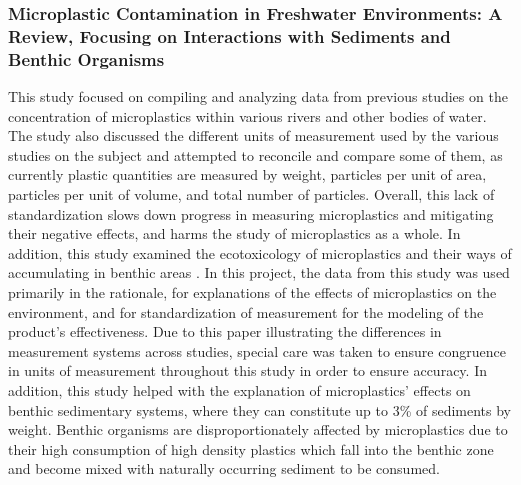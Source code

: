 \documentclass[fleqn,10pt]{SelfArx} %
\begin{document}
	\subsubsection*{Microplastic Contamination in Freshwater Environments: A Review, Focusing on Interactions with Sediments and Benthic Organisms
	}
	This study focused on compiling and analyzing data from previous studies on the concentration of microplastics within various rivers and other bodies of water. The study also discussed the different units of measurement used by the various studies on the subject and attempted to reconcile and compare some of them, as currently plastic quantities are measured by weight, particles per unit of area, particles per unit of volume, and total number of particles. Overall, this lack of standardization slows down progress in measuring microplastics and mitigating their negative effects, and harms the study of microplastics as a whole. In addition, this study examined the ecotoxicology of microplastics and their ways of accumulating in \gls{benthic} areas \cite{BellasiBenthic}.
	In this project, the data from this study was used primarily in the rationale, for explanations of the effects of microplastics on the environment, and for standardization of measurement for the modeling of the product’s effectiveness. Due to this paper illustrating the differences in measurement systems across studies, special care was taken to ensure congruence in units of measurement throughout this study in order to ensure accuracy. In addition, this study helped with the explanation of microplastics’ effects on \gls{benthic} sedimentary systems, where they can constitute up to 3\% of sediments by weight. Benthic organisms are disproportionately affected by microplastics due to their high consumption of high density plastics which fall into the \gls{benthic} zone and become mixed with naturally occurring sediment to be consumed. 
	
\end{document}
